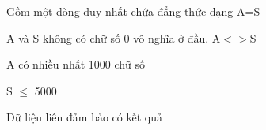 Gồm một dòng duy nhất chứa đẳng thức dạng A=S  

   A và S không có chữ số 0 vô nghĩa ở đầu. A$<$$>$S  

   A có nhiều nhất 1000 chữ số  

   S $\le$ 5000  

   Dữ liệu liên đảm bảo có kết quả  

\